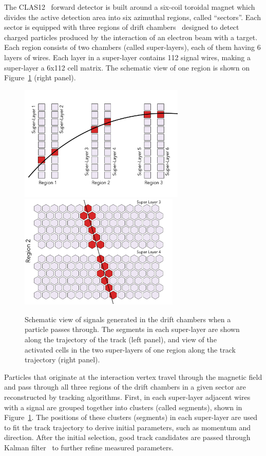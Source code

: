 \documentclass[aps,prl,preprint,12pt]{elsarticle}
\begin{document}
The CLAS12~\cite{Burkert:2020akg} forward detector is built around a six-coil toroidal magnet 
which divides the active detection area into six azimuthal regions, called ``sectors''. Each sector is 
equipped with three regions of drift chambers~\cite{Mestayer:2020saf} designed to detect charged 
particles produced by the interaction of an electron beam with a target. Each region consists of two 
chambers (called super-layers), each of them having 6 layers of wires. Each layer  in a super-layer 
contains 112 signal wires, making a super-layer a 6x112 cell matrix. The schematic view of one region 
is shown on Figure~\ref{dc:side_view} (right panel).

\begin{figure}[!ht]
\begin{center}
 \includegraphics[width=3.1in]{images/dc_diagram.pdf}
 \includegraphics[width=3in]{images/region_2_diagram.pdf}
\caption {Schematic view of signals generated in the drift chambers when a particle passes through. 
The segments in each super-layer are shown along the trajectory of the track (left panel), and view 
of the activated cells in the two super-layers of one region along the track trajectory (right panel).}
 \label{dc:side_view}
 \end{center}
\end{figure}

Particles that originate at the interaction vertex travel through the magnetic field and pass through all 
three regions of the drift chambers in a given sector are reconstructed by tracking algorithms. First, 
in each super-layer adjacent wires with a signal are grouped together into clusters (called segments), 
shown in Figure~\ref{dc:side_view}. The positions of these clusters (segments) in each super-layer 
are used to fit the track trajectory to derive initial parameters, such as momentum and direction. 
After the initial selection, good track candidates are passed through Kalman filter~\cite{Kalman1960} 
 to further refine measured parameters.
\end{document}
